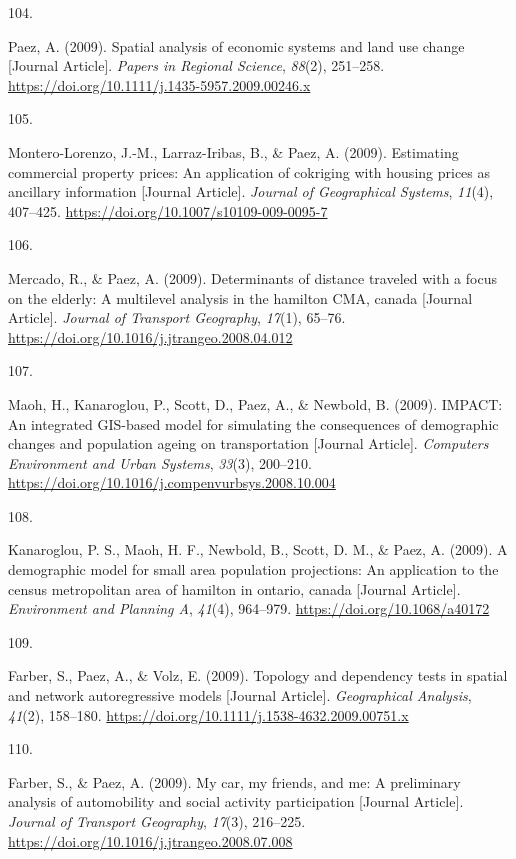 \documentclass[10pt,a4paper,]{twentysecondcv}
\newlength{\csllabelwidth}
\newcommand{\CSLLeftMargin}[1]{\parbox[t]{\csllabelwidth}{#1}}
\newcommand{\CSLRightInline}[1]{\parbox[t]{\linewidth - \csllabelwidth}{#1}}
\begin{document}
\leavevmode{}%
\CSLLeftMargin{104. }%
\CSLRightInline{Paez, A. (2009). Spatial analysis of economic systems
and land use change {[}Journal Article{]}. \emph{Papers in Regional
Science}, \emph{88}(2), 251--258.
\url{https://doi.org/10.1111/j.1435-5957.2009.00246.x}}

\leavevmode{}%
\CSLLeftMargin{105. }%
\CSLRightInline{Montero-Lorenzo, J.-M., Larraz-Iribas, B., \& Paez, A.
(2009). Estimating commercial property prices: An application of
cokriging with housing prices as ancillary information {[}Journal
Article{]}. \emph{Journal of Geographical Systems}, \emph{11}(4),
407--425. \url{https://doi.org/10.1007/s10109-009-0095-7}}

\leavevmode{}%
\CSLLeftMargin{106. }%
\CSLRightInline{Mercado, R., \& Paez, A. (2009). Determinants of
distance traveled with a focus on the elderly: A multilevel analysis in
the hamilton CMA, canada {[}Journal Article{]}. \emph{Journal of
Transport Geography}, \emph{17}(1), 65--76.
\url{https://doi.org/10.1016/j.jtrangeo.2008.04.012}}

\leavevmode{}%
\CSLLeftMargin{107. }%
\CSLRightInline{Maoh, H., Kanaroglou, P., Scott, D., Paez, A., \&
Newbold, B. (2009). IMPACT: An integrated GIS-based model for simulating
the consequences of demographic changes and population ageing on
transportation {[}Journal Article{]}. \emph{Computers Environment and
Urban Systems}, \emph{33}(3), 200--210.
\url{https://doi.org/10.1016/j.compenvurbsys.2008.10.004}}

\leavevmode{}%
\CSLLeftMargin{108. }%
\CSLRightInline{Kanaroglou, P. S., Maoh, H. F., Newbold, B., Scott, D.
M., \& Paez, A. (2009). A demographic model for small area population
projections: An application to the census metropolitan area of hamilton
in ontario, canada {[}Journal Article{]}. \emph{Environment and Planning
A}, \emph{41}(4), 964--979. \url{https://doi.org/10.1068/a40172}}

\leavevmode{}%
\CSLLeftMargin{109. }%
\CSLRightInline{Farber, S., Paez, A., \& Volz, E. (2009). Topology and
dependency tests in spatial and network autoregressive models {[}Journal
Article{]}. \emph{Geographical Analysis}, \emph{41}(2), 158--180.
\url{https://doi.org/10.1111/j.1538-4632.2009.00751.x}}

\leavevmode{}%
\CSLLeftMargin{110. }%
\CSLRightInline{Farber, S., \& Paez, A. (2009). My car, my friends, and
me: A preliminary analysis of automobility and social activity
participation {[}Journal Article{]}. \emph{Journal of Transport
Geography}, \emph{17}(3), 216--225.
\url{https://doi.org/10.1016/j.jtrangeo.2008.07.008}}
\end{document}
